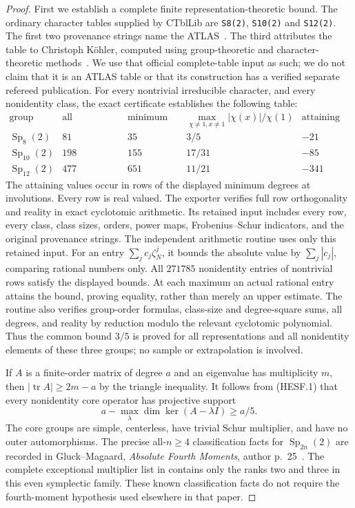 \begin{proof}
First we establish a complete finite representation-theoretic bound. The
ordinary character tables supplied by CTblLib are
\texttt{S8(2)}, \texttt{S10(2)} and \texttt{S12(2)}. The first two
provenance strings name the ATLAS~\cite{SPOR:Atlas,SPOR:CTblLib}. The third attributes the table to
Christoph K\"ohler, computed using group-theoretic and character-theoretic
methods~\cite{HES:S12Data}. We use that official complete-table input as such; we do not claim
that it is an ATLAS table or that its construction has a verified separate
refereed publication. For every nontrivial
irreducible character, and every nonidentity class, the exact certificate
establishes the following table:
\[
\begin{array}{c|r|r|c|r}
\text{group}&\text{all irreducible rows}&\text{minimum degree}&
 \max_{\chi\ne1,x\ne1}|\chi(x)|/\chi(1)&\text{attaining value}\\ \hline
\operatorname{Sp}_8(2)&81&35&3/5&-21\\
\operatorname{Sp}_{10}(2)&198&155&17/31&-85\\
\operatorname{Sp}_{12}(2)&477&651&11/21&-341
\end{array}
\tag{HESF.1}
\]
The attaining values occur in rows of the displayed minimum degrees at
involutions. Every row is real valued. The exporter verifies full row
orthogonality and reality in exact cyclotomic arithmetic. Its retained
input includes every row, every class, class sizes, orders, power maps,
Frobenius--Schur indicators, and the original provenance strings.
The independent arithmetic routine uses only this retained input. For an
entry $\sum_jc_j\zeta_N^j$, it bounds the absolute value by
$\sum_j|c_j|$, comparing rational numbers only. All $271785$ nonidentity
entries of nontrivial rows satisfy the displayed bounds. At each maximum
an actual rational entry attains the bound, proving equality, rather than
merely an upper estimate. The routine also verifies group-order formulas,
class-size and degree-square sums, all degrees, and reality by reduction
modulo the relevant cyclotomic polynomial. Thus the common bound $3/5$
is proved for all representations and all nonidentity elements of these
three groups; no sample or extrapolation is involved.

If $A$ is a finite-order matrix of degree $a$ and an eigenvalue has
multiplicity $m$, then $|\operatorname{tr}A|\ge 2m-a$ by the triangle
inequality. It follows from (HESF.1) that every nonidentity core operator
has projective support
\[
          a-\max_\lambda\dim\ker(A-\lambda I)\ge a/5.
\tag{HESF.2}
\]
The core groups are simple, centerless, have trivial Schur multiplier, and
have no outer automorphisms. The precise all-$n\ge4$ classification facts
for $\operatorname{Sp}_{2n}(2)$ are recorded in Gluck--Magaard,
\emph{Absolute Fourth Moments}, author p.~25~\cite{HES:GM2006}. The complete exceptional
multiplier list in \cite[Chapter~5, Table~1, numbered p.~35]{BI:HHM}
contains only the ranks two and three in this even symplectic family.
These known classification facts do not require the fourth-moment
hypothesis used elsewhere in that paper.


\end{proof}
